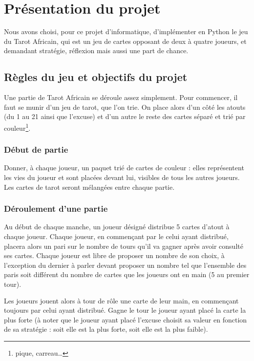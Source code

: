 \section{Présentation du projet}\label{sec:présentation-du-projet}
   Nous avons choisi, pour ce projet d'informatique, d'implémenter en Python le jeu du Tarot Africain, qui est un jeu de cartes opposant de deux à quatre joueurs, et demandant stratégie, réflexion mais aussi une part de chance.

   \subsection{Règles du jeu et objectifs du projet}\label{subsec:règles-du-jeu-et-objectifs-du-projet}
      Une partie de Tarot Africain se déroule assez simplement.
      Pour commencer, il faut se munir d'un jeu de tarot, que l'on trie.
      On place alors d'un côté les atouts (du 1 au 21 ainsi que l'excuse) et d'un autre le reste des cartes séparé et trié par couleur\footnote{pique, carreau\dots}.
      \subsubsection{Début de partie}
         Donner, à chaque joueur, un paquet trié de cartes de couleur : elles représentent les vies du joueur et sont placées devant lui, visibles de tous les autres joueurs.
         Les cartes de tarot seront mélangées entre chaque partie.
      \subsubsection{Déroulement d'une partie}
         Au début de chaque manche, un joueur désigné distribue 5 cartes d'atout à chaque joueur.
         Chaque joueur, en commençant par le celui ayant distribué, placera alors un pari sur le nombre de tours qu'il va gagner après avoir consulté ses cartes.
         Chaque joueur est libre de proposer un nombre de son choix, à l'exception du dernier à parler devant proposer un nombre tel que l'ensemble des paris soit différent du nombre de cartes que les joueurs ont en main (5 au premier tour).

         Les joueurs jouent alors à tour de rôle une carte de leur main, en commençant toujours par celui ayant distribué.
         Gagne le tour le joueur ayant placé la carte la plus forte (à noter que le joueur ayant placé l'excuse choisit sa valeur en fonction de sa stratégie : soit elle est la plus forte, soit elle est la plus faible).

